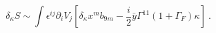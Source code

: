 \begin{equation}
\delta_\kappa S \sim \int \epsilon^{ij}\partial_{i}V_j[\delta_{\kappa} x^m b_{9m}-\frac i2 \bar y \Gamma^{ {11}}
(1+\Gamma_{F})\kappa] \ .
\end{equation}

